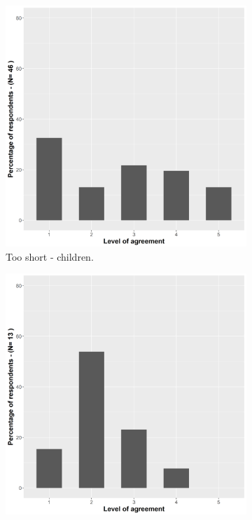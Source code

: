 \begin{figure}[t]
\centering
  \begin{subfigure}[t]{0.49\columnwidth}
    \centering
    \includegraphics[width=\linewidth]{images/06-deception/staticTooShortYoung}
    \caption{Too short - children.}
    \label{fig::staticTooShortYoung}
  \end{subfigure}
  \hspace{0.01\columnwidth}
  \begin{subfigure}[t]{0.49\columnwidth}
    \centering
    \includegraphics[width=\linewidth]{images/06-deception/staticTooShortAdults}

\end{subfigure}
\end{figure}

